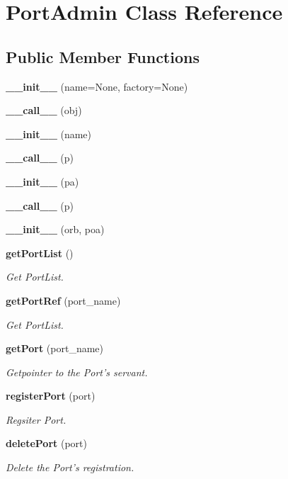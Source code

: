 \section{Port\-Admin Class Reference}
\label{classPortAdmin}
\subsection*{Public Member Functions}
\begin{CompactItemize}
\item 
{\bf \_\-\_\-init\_\-\_\-} (name=None, factory=None)
\item 
{\bf \_\-\_\-call\_\-\_\-} (obj)
\item 
{\bf \_\-\_\-init\_\-\_\-} (name)
\item 
{\bf \_\-\_\-call\_\-\_\-} (p)
\item 
{\bf \_\-\_\-init\_\-\_\-} (pa)
\item 
{\bf \_\-\_\-call\_\-\_\-} (p)
\item 
{\bf \_\-\_\-init\_\-\_\-} (orb, poa)
\item 
{\bf get\-Port\-List} ()
\begin{CompactList}\small\item\em Get Port\-List. \item\end{CompactList}\item 
{\bf get\-Port\-Ref} (port\_\-name)
\begin{CompactList}\small\item\em Get Port\-List. \item\end{CompactList}\item 
{\bf get\-Port} (port\_\-name)
\begin{CompactList}\small\item\em Getpointer to the Port's servant. \item\end{CompactList}\item 
{\bf register\-Port} (port)
\begin{CompactList}\small\item\em Regsiter Port. \item\end{CompactList}\item 
{\bf delete\-Port} (port)
\begin{CompactList}\small\item\em Delete the Port's registration. \item\end{CompactList}\item 

\end{CompactItemize}
